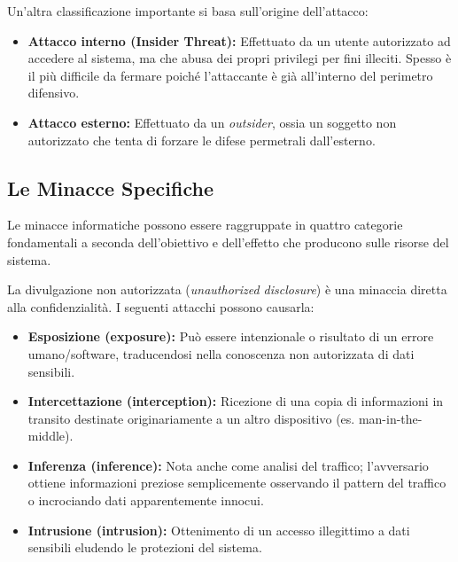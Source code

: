Un'altra classificazione importante si basa sull'origine dell'attacco:
\begin{itemize}
    \item \textbf{Attacco interno (Insider Threat):} Effettuato da un utente autorizzato ad accedere al sistema, ma che abusa dei propri privilegi per fini illeciti. Spesso è il più difficile da fermare poiché l'attaccante è già all'interno del perimetro difensivo.
    \item \textbf{Attacco esterno:} Effettuato da un \textit{outsider}, ossia un soggetto non autorizzato che tenta di forzare le difese permetrali dall'esterno.
\end{itemize}

\subsection{Le Minacce Specifiche}

Le minacce informatiche possono essere raggruppate in quattro categorie fondamentali a seconda dell'obiettivo e dell'effetto che producono sulle risorse del sistema.

\begin{warnbox}
La divulgazione non autorizzata (\textit{unauthorized disclosure}) è una minaccia diretta alla confidenzialità. I seguenti attacchi possono causarla:
\begin{itemize}
    \item \textbf{Esposizione (exposure):} Può essere intenzionale o risultato di un errore umano/software, traducendosi nella conoscenza non autorizzata di dati sensibili.
    \item \textbf{Intercettazione (interception):} Ricezione di una copia di informazioni in transito destinate originariamente a un altro dispositivo (es. man-in-the-middle).
    \item \textbf{Inferenza (inference):} Nota anche come analisi del traffico; l'avversario ottiene informazioni preziose semplicemente osservando il pattern del traffico o incrociando dati apparentemente innocui.
    \item \textbf{Intrusione (intrusion):} Ottenimento di un accesso illegittimo a dati sensibili eludendo le protezioni del sistema.
\end{itemize}
\end{warnbox}


